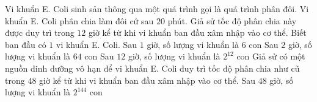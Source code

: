 

\begin{ex}%
	Vi khuẩn E. Coli sinh sản thông qua một quá trình gọi là quá trình phân đôi. Vi khuẩn E. Coli phân chia làm đôi cứ sau $20$ phút. Giả sử tốc độ phân chia này được duy trì trong $12$ giờ kể từ khi vi khuẩn ban đầu xâm nhập vào cơ thể. Biết ban đầu có $1$ vi  khuẩn E. Coli.
	\choiceTF 
		{Sau $1$ giờ, số  lượng vi khuẩn là $6$ con}
		{\True Sau $2$ giờ, số  lượng vi khuẩn là $64$ con}
		{Sau $12$ giờ, số lượng vi khuẩn là $2^{12}$ con} 
		{\True Giả sử có một nguồn dinh dưỡng vô hạn để vi khuẩn E. Coli duy trì tốc độ phân chia như cũ trong $48$ giờ kể từ khi vi khuẩn ban đầu xâm nhập vào cơ thể. Sau $48$  giờ, số lượng vi khuẩn là $2^{144}$ con}
\end{ex}

